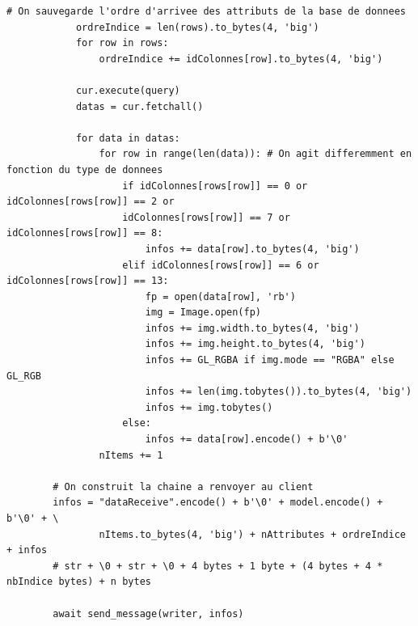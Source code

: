 \documentclass[twoside]{report}
\begin{document}
\begin{appendix}
\begin{lstlisting}[style=py, caption=serveur.py : SQL, label=sql]
            # On sauvegarde l'ordre d'arrivee des attributs de la base de donnees
            ordreIndice = len(rows).to_bytes(4, 'big')
            for row in rows:
                ordreIndice += idColonnes[row].to_bytes(4, 'big')

            cur.execute(query)
            datas = cur.fetchall()

            for data in datas:
                for row in range(len(data)): # On agit differemment en fonction du type de donnees
                    if idColonnes[rows[row]] == 0 or idColonnes[rows[row]] == 2 or
                    idColonnes[rows[row]] == 7 or idColonnes[rows[row]] == 8:
                        infos += data[row].to_bytes(4, 'big')
                    elif idColonnes[rows[row]] == 6 or idColonnes[rows[row]] == 13:
                        fp = open(data[row], 'rb')
                        img = Image.open(fp)
                        infos += img.width.to_bytes(4, 'big')
                        infos += img.height.to_bytes(4, 'big')
                        infos += GL_RGBA if img.mode == "RGBA" else GL_RGB
                        infos += len(img.tobytes()).to_bytes(4, 'big')
                        infos += img.tobytes()
                    else:
                        infos += data[row].encode() + b'\0'
                nItems += 1

        # On construit la chaine a renvoyer au client
        infos = "dataReceive".encode() + b'\0' + model.encode() + b'\0' + \
                nItems.to_bytes(4, 'big') + nAttributes + ordreIndice + infos
        # str + \0 + str + \0 + 4 bytes + 1 byte + (4 bytes + 4 * nbIndice bytes) + n bytes
        
        await send_message(writer, infos)
\end{lstlisting}
\end{appendix}
\end{document}
